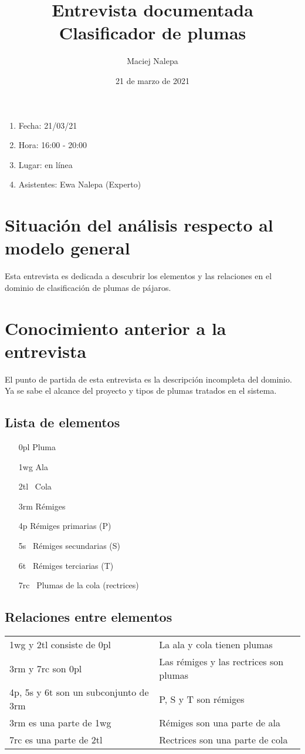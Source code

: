 \documentclass[a4paper,12pt]{article}
\title{Entrevista documentada\\ \normalsize{Clasificador de plumas}}
\author{Maciej Nalepa}
\date{21 de marzo de 2021}
\begin{document}
\maketitle

\begin{enumerate}
	\item Fecha: 21/03/21
	\item Hora: 16:00 - 20:00
	\item Lugar: en línea
	\item Asistentes: Ewa Nalepa (Experto)
\end{enumerate}

\section{Situación del análisis respecto al modelo general}
Esta entrevista es dedicada a descubrir los elementos y las relaciones en el dominio de clasificación de plumas de pájaros.

\section{Conocimiento anterior a la entrevista}
El punto de partida de esta entrevista es la descripción incompleta del dominio.
Ya se sabe el alcance del proyecto y tipos de plumas tratados en el sistema.

\subsection{Lista de elementos}
\begin{itemize}
	\item[0pl] Pluma
	\item[1wg] Ala
	\item[2tl] Cola
	\item[3rm] Rémiges
	\item[4p] Rémiges primarias (P)
	\item[5s] Rémiges secundarias (S)
	\item[6t] Rémiges terciarias (T)
	\item[7rc] Plumas de la cola (rectrices)
\end{itemize}

\subsection{Relaciones entre elementos}
\begin{table}[H]
	\centering
	\begin{tabular}{ll}
		1wg y 2tl consiste de 0pl			  & La ala y cola tienen plumas \\
		3rm y 7rc son 0pl					  & Las rémiges y las rectrices son plumas \\
		4p, 5s y 6t son un subconjunto de 3rm & P, S y T son rémiges            \\
		3rm es una parte de 1wg               & Rémiges son una parte de ala    \\
		7rc es una parte de 2tl               & Rectrices son una parte de cola
	\end{tabular}
\end{table}
\end{document}
